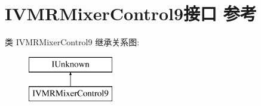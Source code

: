 \hypertarget{interface_i_v_m_r_mixer_control9}{}\section{I\+V\+M\+R\+Mixer\+Control9接口 参考}
\label{interface_i_v_m_r_mixer_control9}
类 I\+V\+M\+R\+Mixer\+Control9 继承关系图\+:\begin{figure}[H]
\begin{center}
\leavevmode
\includegraphics[height=2.000000cm]{interface_i_v_m_r_mixer_control9}
\end{center}
\end{figure}
